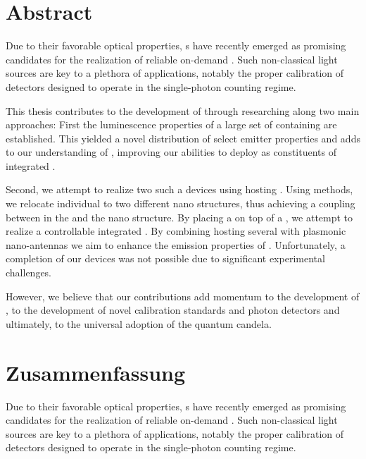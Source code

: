 \null\vfill


\section*{Abstract}

	Due to their favorable optical properties, \sivc{}s have recently emerged as promising candidates for the realization of reliable on-demand \spss. Such non-classical light sources are key to a plethora of applications, notably the proper calibration of detectors designed to operate in the single-photon counting regime.

	This thesis contributes to the development of \spss through researching \sivs along two main approaches: First the luminescence properties of a large set of \nds containing \sivs are established. This yielded a novel distribution of select emitter properties and adds to our understanding of \sivs, improving our abilities to deploy \sivs as constituents of integrated \sps.

	Second, we attempt to realize two such a devices using \nds hosting \sivs. Using \pp methods, we relocate individual \nds to two different nano structures, thus achieving a coupling between \sivs in the \nd and the nano structure. By placing a \nd on top of a \vcsel, we attempt to realize a controllable integrated \sps. By combining \nds hosting several \sivs with plasmonic nano-antennas we aim to enhance the emission properties of \sivs. Unfortunately, a completion of our devices was not possible due to significant experimental challenges.

	However, we believe that our contributions add momentum to the development of \sps, to the development of novel calibration standards and photon detectors and ultimately, to the universal adoption of the quantum candela.




\vfill

\newpage

\null\vfill

\section*{Zusammenfassung}

	Due to their favorable optical properties, \sivc{}s have recently emerged as promising candidates for the realization of reliable on-demand \spss. Such non-classical light sources are key to a plethora of applications, notably the proper calibration of detectors designed to operate in the single-photon counting regime.

